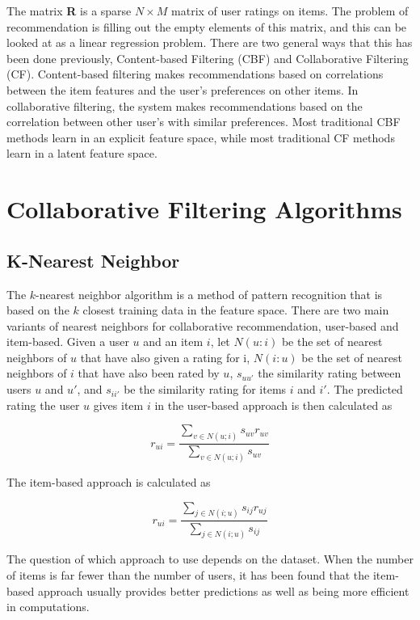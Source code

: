 The matrix {\bf R} is a sparse $N \times M$ matrix of user ratings on items. The problem of recommendation is filling out the empty elements of this matrix, and this can be looked at as a linear regression problem. There are two general ways that this has been done previously, Content-based Filtering (CBF) and Collaborative Filtering (CF). Content-based filtering makes recommendations based on correlations between the item features and the user's preferences on other items. In collaborative filtering, the system makes recommendations based on the correlation between other user's with similar preferences. Most traditional CBF methods learn in an explicit feature space, while most traditional CF methods learn in a latent feature space. 

\section{Collaborative Filtering Algorithms}
\subsection{K-Nearest Neighbor}

The $k$-nearest neighbor algorithm is a method of pattern recognition that is based on the $k$ closest training data in the feature space. There are two main variants of nearest neighbors for collaborative recommendation, user-based and item-based. Given a user $u$ and an item $i$, let $N(u:i)$ be the set of nearest neighbors of $u$ that have also given a rating for i, $N(i:u)$ be the set of nearest neighbors of $i$ that have also been rated by $u$, $s_{uu'}$ the similarity rating between users $u$ and $u'$, and $s_{ii'}$ be the similarity rating for items $i$ and $i'$. The predicted rating the user $u$ gives item $i$ in the user-based approach is then calculated as

\[
r_{ui} = \frac    {\sum_{v\in N(u;i)} {s_{uv}r_{uv}} } {\sum_{v\in N(u;i)}{s_{uv}}}
\]

The item-based approach is calculated as 

\[
r_{ui} = \frac    {\sum_{j\in N(i;u)} {s_{ij}r_{uj}} } {\sum_{j\in N(i;u)}{s_{ij}}}
\]

The question of which approach to use depends on the dataset. When the number of items is far fewer than the number of users, it has been found that the item-based approach usually provides better predictions as well as being more efficient in computations. 

\begin{comment}
This applies to the MovieLens 1 Million dataset as well. For the MovieLens 100,000 dataset, the number of items is larger than the number of users, and the user-based approach has been found to perform better.
\end{comment}

